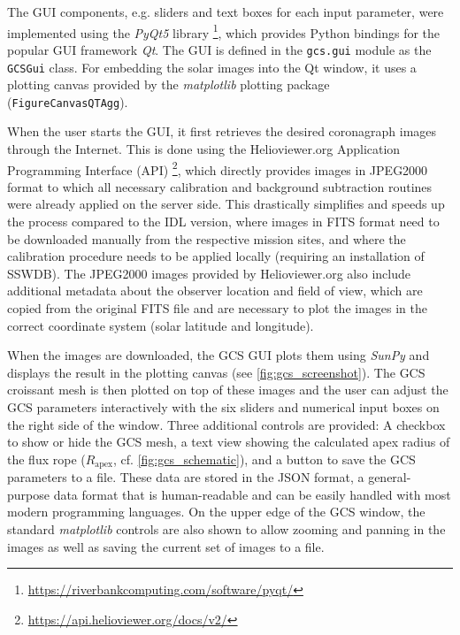 The \ac{GUI} components, e.g. sliders and text boxes for each input parameter, were implemented using the \textit{PyQt5} library \footnote{\url{https://riverbankcomputing.com/software/pyqt/}}, which provides Python bindings for the popular \ac{GUI} framework \textit{Qt}. The \ac{GUI} is defined in the \texttt{gcs.gui} module as the \texttt{GCSGui} class. For embedding the solar images into the Qt window, it uses a plotting canvas provided by the \textit{matplotlib} plotting package (\texttt{FigureCanvasQTAgg}).

When the user starts the \ac{GUI}, it first retrieves the desired coronagraph images through the Internet. This is done using the Helioviewer.org Application Programming Interface (API) \footnote{\url{https://api.helioviewer.org/docs/v2/}}, which directly provides images in JPEG2000 format to which all necessary calibration and background subtraction routines were already applied on the server side. This drastically simplifies and speeds up the process compared to the \ac{IDL} version, where images in FITS format need to be downloaded manually from the respective mission sites, and where the calibration procedure needs to be applied locally (requiring an installation of SSWDB). The JPEG2000 images provided by Helioviewer.org also include additional metadata about the observer location and field of view, which are copied from the original FITS file and are necessary to plot the images in the correct coordinate system (solar latitude and longitude).

When the images are downloaded, the \ac{GCS} \ac{GUI} plots them using \textit{SunPy} and displays the result in the plotting canvas (see \autoref{fig:gcs_screenshot}). The \ac{GCS} croissant mesh is then plotted on top of these images and the user can adjust the \ac{GCS} parameters interactively with the six sliders and numerical input boxes on the right side of the window. Three additional controls are provided: A checkbox to show or hide the \ac{GCS} mesh, a text view showing the calculated apex radius of the flux rope ($R_\text{apex}$, cf. \autoref{fig:gcs_schematic}), and a button to save the \ac{GCS} parameters to a file. These data are stored in the \ac{JSON} format, a general-purpose data format that is human-readable and can be easily handled with most modern programming languages. On the upper edge of the \ac{GCS} window, the standard \textit{matplotlib} controls are also shown to allow zooming and panning in the images as well as saving the current set of images to a file.

